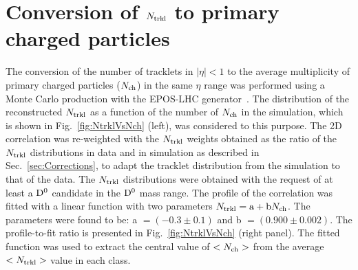 \section {Conversion of $N_{\rm trkl}$ to primary charged particles}
\label{sec:NtrklToNch}
The conversion of the number of tracklets in $|\eta|<1$ to the average multiplicity of primary charged particles ($N_{\rm ch}$) 
in the same $\eta$ range was performed using a Monte Carlo production with the EPOS-LHC generator~\cite{Drescher:2000ha}. 
The distribution of the reconstructed $N_{\rm trkl}$ as a function of the number of
$N_{\rm ch}$ in the simulation, which is shown in Fig.~\ref{fig:NtrklVsNch} (left), was considered to this purpose.
The 2D correlation was re-weighted with the $N_{\rm trkl}$ weights obtained
as the ratio of the $N_{\rm trkl}$ distributions in data and in simulation as described in 
Sec.~\ref{sec:Corrections}, to adapt the tracklet distribution from the simulation to that of the data.
The $N_{\rm trkl}$ distributions were obtained with the request of at least a ${\rm D^0}$ candidate
in the ${\rm D^0}$ mass range. 
The profile of the correlation was fitted with a linear function with two parameters $N_{\rm trkl}={\rm a}+{\rm b} N_{\rm ch}$.
The parameters were found to be: a $=(-0.3 \pm 0.1)$ and b $=(0.900\pm 0.002)$. The profile-to-fit ratio
is presented in Fig.~\ref{fig:NtrklVsNch} (right panel). The fitted function was used 
to extract the central value of $<N_{\rm ch}>$ from the average $<N_{\rm trkl}>$ value in each class. \\



